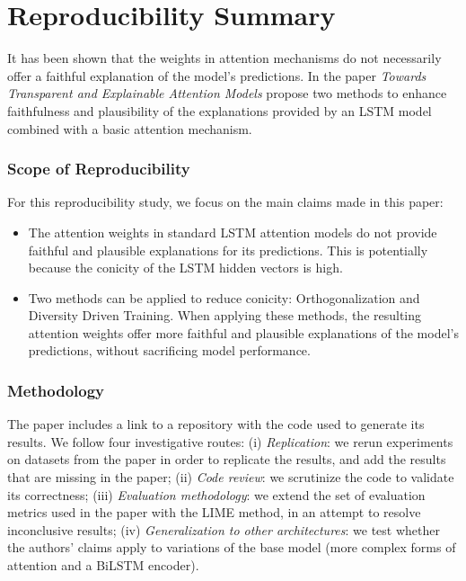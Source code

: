 \section*{\centering Reproducibility Summary}

It has been shown \citep{jain-wallace-2019-attention} that the weights in attention mechanisms do not necessarily offer a faithful explanation of the model's predictions. In the paper \textit{Towards Transparent and Explainable Attention Models} \citet{mohankumar_towards_2020} propose two methods to enhance faithfulness and plausibility of the explanations provided by an LSTM model combined with a basic attention mechanism. 

\subsubsection{Scope of Reproducibility}For this reproducibility study, we focus on the main claims made in this paper:
\begin{itemize}
    \item The attention weights in standard LSTM attention models do not provide faithful and plausible explanations for its predictions.
    This is potentially because the conicity of the LSTM hidden vectors is high. 
    \item Two methods can be applied to reduce conicity: Orthogonalization and Diversity Driven Training. When applying these methods, the resulting attention weights offer more faithful and plausible explanations of the model's predictions, without sacrificing model performance.
\end{itemize}

\subsubsection{Methodology}The paper includes a link to a repository with the code used to generate its results. We follow four investigative routes:
(i) \textit{Replication}: we rerun experiments on datasets from the paper in order to replicate the results, and add the results that are missing in the paper; 
(ii) \textit{Code review}: we scrutinize the code to validate its correctness;
(iii) \textit{Evaluation methodology}: we extend the set of evaluation metrics used in the paper with the LIME method, in an attempt to resolve inconclusive results;
(iv) \textit{Generalization to other architectures}: we test whether the authors' claims apply to variations of the base model (more complex forms of attention and a BiLSTM encoder).

